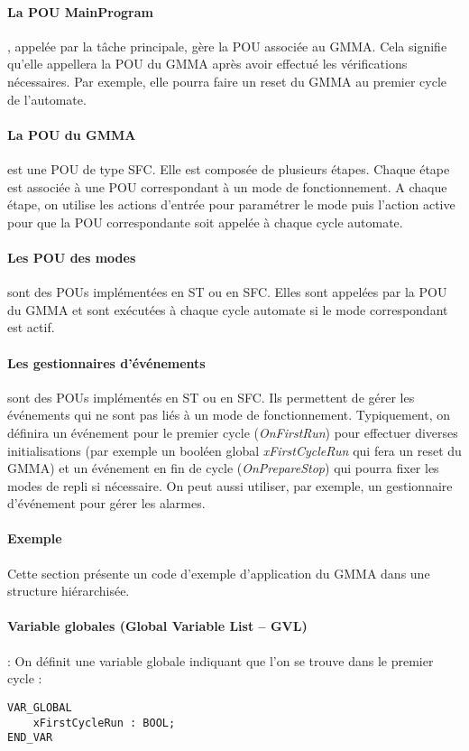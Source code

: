 \paragraph{La POU MainProgram}, appelée par la tâche principale, gère la POU associée au GMMA. Cela signifie qu'elle appellera la POU du GMMA après avoir effectué les vérifications nécessaires. Par exemple, elle pourra faire un reset du GMMA au premier cycle de l'automate.

\paragraph{La POU du GMMA} est une POU de type SFC. Elle est composée de plusieurs étapes. Chaque étape est associée à une POU correspondant à un mode de fonctionnement.
A chaque étape, on utilise les actions d'entrée pour paramétrer le mode puis l'action active pour que la POU correspondante soit appelée à chaque cycle automate.

\paragraph{Les POU des modes} sont des POUs implémentées en ST ou en SFC. Elles sont appelées par la POU du GMMA et sont exécutées à chaque cycle automate si le mode correspondant est actif.

\paragraph{Les gestionnaires d'événements} sont des POUs implémentés en ST ou en SFC.  Ils permettent de gérer les événements qui ne sont pas liés à un mode de fonctionnement. Typiquement, on définira un événement pour le premier cycle (\emph{OnFirstRun}) pour effectuer diverses initialisations (par exemple un booléen global \emph{xFirstCycleRun} qui fera un reset du GMMA) et un événement en fin de cycle (\emph{OnPrepareStop}) qui pourra fixer les modes de repli si nécessaire. On peut aussi utiliser, par exemple, un gestionnaire d'événement pour gérer les alarmes.

\paragraph{Exemple}
Cette section présente un code d'exemple d'application du GMMA dans une structure hiérarchisée.
\paragraph{Variable globales (Global Variable List -- GVL)} :
On définit une variable globale indiquant que l'on se trouve dans le premier cycle :
\begin{lstlisting}[language=ST]
VAR_GLOBAL
    xFirstCycleRun : BOOL;
END_VAR
\end{lstlisting}


